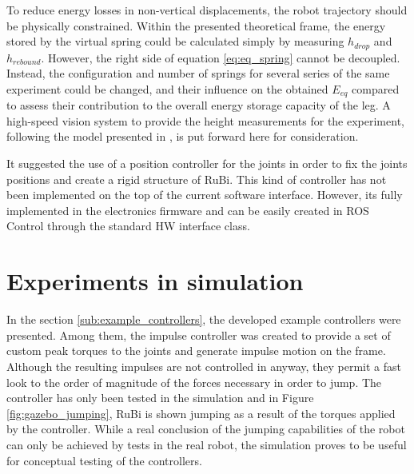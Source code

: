 To reduce energy losses in non-vertical displacements, the robot trajectory should be physically constrained.
Within the presented theoretical frame, the energy stored by the virtual spring could be calculated simply by measuring $h_{drop}$ and $h_{rebound}$.
However, the right side of equation \ref{eq:eq_spring} cannot be decoupled.
Instead, the configuration and number of springs for several series of the same experiment could be changed, and their influence on the obtained $E_{eq}$ compared to assess their contribution to the overall energy storage capacity of the leg.
A high-speed vision system to provide the height measurements for the experiment, following the model presented in \cite{hs_vision}, is put forward here for consideration. 

It suggested the use of a position controller for the joints in order to fix the joints positions and create a rigid structure of RuBi.
This kind of controller has not been implemented on the top of the current software interface.
However, its fully implemented in the electronics firmware and can be easily created in ROS Control through the standard HW interface class.


\section{Experiments in simulation} %
\label{sec:simulation_experiments}
In the section \ref{sub:example_controllers}, the developed example controllers were presented.
Among them, the impulse controller was created to provide a set of custom peak torques to the joints and generate impulse motion on the frame.
Although the resulting impulses are not controlled in anyway, they permit a fast look to the order of magnitude of the forces necessary in order to jump.
The controller has only been tested in the simulation and in Figure \ref{fig:gazebo_jumping}, RuBi is shown jumping as a result of the torques applied by the controller.
While a real conclusion of the jumping capabilities of the robot can only be achieved by tests in the real robot, the simulation proves to be useful for conceptual testing of the controllers.





